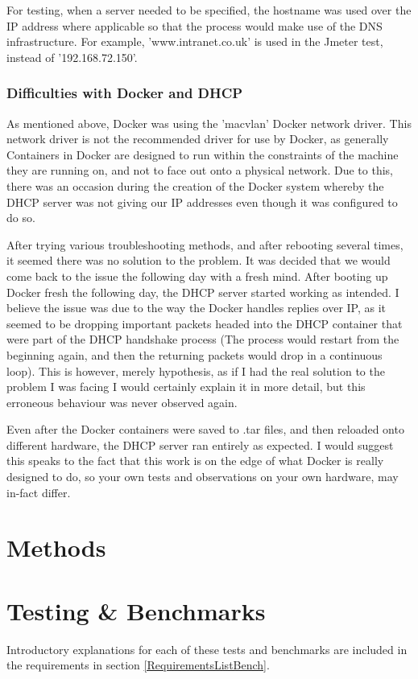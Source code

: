 For testing, when a server needed to be specified, the hostname was used over the IP address where applicable so that the process would make use of the DNS infrastructure. For example, 'www.intranet.co.uk' is used in the Jmeter test, instead of '192.168.72.150'.

\subsection{Difficulties with Docker and DHCP}
As mentioned above, Docker was using the 'macvlan' Docker network driver. This network driver is not the recommended driver for use by Docker, as generally Containers in Docker are designed to run within the constraints of the machine they are running on, and not to face out onto a physical network. Due to this, there was an occasion during the creation of the Docker system whereby the DHCP server was not giving our IP addresses even though it was configured to do so.

After trying various troubleshooting methods, and after rebooting several times, it seemed there was no solution to the problem. It was decided that we would come back to the issue the following day with a fresh mind. After booting up Docker fresh the following day, the DHCP server started working as intended. I believe the issue was due to the way the Docker handles replies over IP, as it seemed to be dropping important packets headed into the DHCP container that were part of the DHCP handshake process (The process would restart from the beginning again, and then the returning packets would drop in a continuous loop). This is however, merely hypothesis, as if I had the real solution to the problem I was facing I would certainly explain it in more detail, but this erroneous behaviour was never observed again. 

Even after the Docker containers were saved to .tar files, and then reloaded onto different hardware, the DHCP server ran entirely as expected. I would suggest this speaks to the fact that this work is on the edge of what Docker is really designed to do, so your own tests and observations on your own hardware, may in-fact differ.

\chapter{Methods}

\chapter{Testing \& Benchmarks}
Introductory explanations for each of these tests and benchmarks are included in the requirements in section \ref{RequirementsListBench}.

